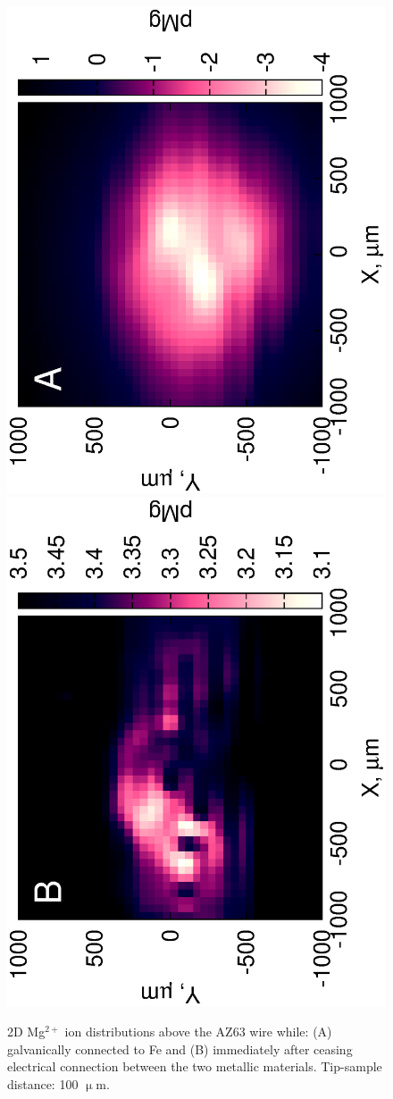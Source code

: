 \documentclass[3p]{elsarticle}
\begin{document}
\begin{figure}
\centering
\includegraphics[trim = 10mm 20mm 0mm 10mm, clip, width=\s\textwidth, angle=-90]{17012501.eps}\includegraphics[trim = 10mm 20mm 0mm 10mm, clip, width=\s\textwidth, angle=-90]{17012503_deconvoluted.eps}
\caption{2D Mg$^{2+}$ ion distributions above the AZ63 wire while: (A) galvanically connected to Fe and (B) immediately after ceasing electrical connection between the two metallic materials. Tip-sample distance: 100 $\upmu$m.}
\label{fig:2d}
\end{figure}





\
\end{document}
